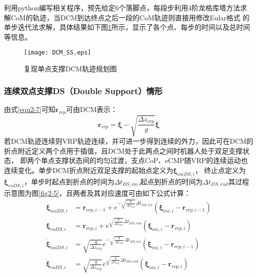             利用python编写相关程序，预先给定6个落脚点，每段步利用4阶龙格库塔方法求解CoM的轨迹，当DCM到达终点之后一段的CoM轨迹则直接用修改Eular格式
            的单步迭代法求解，具体结果如下图\ref{fig2-4}所示，显示了各个点、每步的时间以及总时间等信息。
            \begin{figure}[h] 
                \centering
                \texttt{[image: DCM\_SS.eps]}
                \caption{复现单点支撑DCM轨迹规划图} \label{fig2-4}
            \end{figure}
            \FloatBarrier
        \subsubsection{连续双点支撑DS（Double Support）情形}
            由式\eqref{equ2-7}可知$\boldsymbol{r}_{vrp}$可由DCM表示：
            \begin{equation}
                \boldsymbol{r}_{vrp}=\boldsymbol{\xi }-\sqrt{\frac{\varDelta z_{vrp}}{g}}\boldsymbol{\dot{\xi}}
                \label{equ2-13}
            \end{equation}
            若DCM轨迹连续则VRP轨迹连续，并可进一步得到连续的外力，因此可在DCM的折点附近定义两个点用于插值，且DCM处于此两点之间时机器人处于双足支撑状态，
            即两个单点支撑状态间的均匀过渡，支点CoP、eCMP随VRP的连续运动也连续变化。单步DCM折点附近双足支撑的起始点定义为$\boldsymbol{\xi}_{iniDS,i}$，
            终止点定义为$\boldsymbol{\xi}_{eoDS,i}$，单步时起点到折点的时间为$\varDelta t_{DS,ini}$,起点到折点的时间为$\varDelta t_{DS,end}$其过程
            示意图为图\ref{fig2-5}，且两者及其对应速度可由如下公式计算：
            \begin{subequations}
                \begin{align}
                    \boldsymbol{\xi }_{iniDS,i}&=\boldsymbol{r}_{vrp,i-1}+e^{-\sqrt{\frac{g}{\varDelta z_{vrp}}}\varDelta t_{DS,ini}}\left( \boldsymbol{\xi }_{ini,i}-\boldsymbol{r}_{vrp,i-1} \right) 
                    \label{equ2-14a}\\
                    \boldsymbol{\xi }_{eoDS,i}&=\boldsymbol{r}_{vrp,i}+e^{\sqrt{\frac{g}{\varDelta z_{vrp}}}\varDelta t_{DS,end}}\left( \boldsymbol{\xi }_{ini,i}-\boldsymbol{r}_{vrp,i} \right) 
                    \label{equ2-14b}\\
                    \boldsymbol{\dot{\xi}}_{iniDS,i}&=\sqrt{\frac{g}{\varDelta z_{vrp}}}e^{-\sqrt{\frac{g}{\varDelta z_{vrp}}}\varDelta t_{DS,ini}}\left( \boldsymbol{\xi }_{ini,i}-\boldsymbol{r}_{vrp,i-1} \right) 
                    \label{equ2-14c}\\
                    \boldsymbol{\dot{\xi}}_{eoDS,i}&=\sqrt{\frac{g}{\varDelta z_{vrp}}}e^{\sqrt{\frac{g}{\varDelta z_{vrp}}}\varDelta t_{DS,end}}\left( \boldsymbol{\xi }_{ini,i}-\boldsymbol{r}_{vrp,i} \right) 
                    \label{equ2-14d}
                \end{align}
            \end{subequations}
